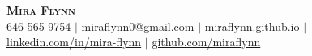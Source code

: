 \documentclass[letterpaper,11pt]{article}
\begin{document}


\begin{center}
    \textbf{\Huge \scshape Mira Flynn} \\ \vspace{1pt}
    \small 646-565-9754 $|$ \href{mailto:miraflynn0@gmail.com}{miraflynn0@gmail.com} $|$
    \href{https://miraflynn.github.io/}{miraflynn.github.io} $|$
    \href{https://www.linkedin.com/in/mira-flynn/}{linkedin.com/in/mira-flynn} $|$
    \href{https://github.com/miraflynn}{github.com/miraflynn}
\end{center}
\vspace{-12pt}


\end{document}
